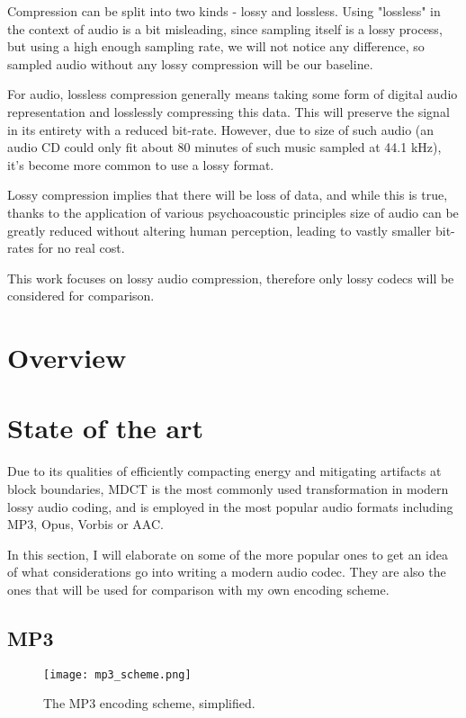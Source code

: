 Compression can be split into two kinds - lossy and lossless. Using "lossless" in the context of audio is a bit misleading, since sampling itself is a lossy process, but using a high enough sampling rate, we will not notice any difference, so sampled audio without any lossy compression will be our baseline.

For audio, lossless compression generally means taking some form of digital audio representation and losslessly compressing this data. This will preserve the signal in its entirety with a reduced bit-rate. However, due to size of such audio (an audio CD could only fit about 80 minutes of such music sampled at 44.1 kHz), it's become more common to use a lossy format.

Lossy compression implies that there will be loss of data, and while this is true, thanks to the application of various psychoacoustic principles size of audio can be greatly reduced without altering human perception, leading to vastly smaller bit-rates for no real cost.

This work focuses on lossy audio compression, therefore only lossy codecs will be considered for comparison.

\section{Overview}

\section{State of the art}
Due to its qualities of efficiently compacting energy and mitigating artifacts at block boundaries, MDCT is the most commonly used transformation in modern lossy audio coding, and is employed in the most popular audio formats including MP3, Opus, Vorbis or AAC.

In this section, I will elaborate on some of the more popular ones to get an idea of what considerations go into writing a modern audio codec. They are also the ones that will be used for comparison with my own encoding scheme.

\subsection{MP3}
\begin{figure}[ht]
	\caption[MP3 encoding scheme]{The MP3 encoding scheme, simplified.}
	\label{fig:mp3_scheme}
	\centering
	\texttt{[image: mp3\_scheme.png]}
\end{figure}


